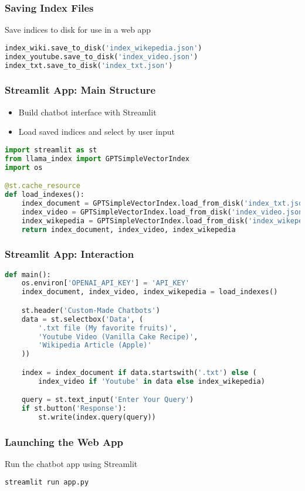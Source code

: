 \begin{frame}[fragile]\frametitle{Saving Index Files}

Save indices to disk for use in a web app

\begin{lstlisting}[language=Python]
index_wiki.save_to_disk('index_wikepedia.json')
index_youtube.save_to_disk('index_video.json')
index_txt.save_to_disk('index_txt.json')
\end{lstlisting}
\end{frame}

\begin{frame}[fragile]\frametitle{Streamlit App: Main Structure}
    \begin{itemize}
        \item Build chatbot interface with Streamlit
        \item Load saved indices and select by user input
    \end{itemize}
\begin{lstlisting}[language=Python]
import streamlit as st
from llama_index import GPTSimpleVectorIndex
import os

@st.cache_resource
def load_indexes():
    index_document = GPTSimpleVectorIndex.load_from_disk('index_txt.json')
    index_video = GPTSimpleVectorIndex.load_from_disk('index_video.json')
    index_wikepedia = GPTSimpleVectorIndex.load_from_disk('index_wikepedia.json')
    return index_document, index_video, index_wikepedia
\end{lstlisting}
\end{frame}

\begin{frame}[fragile]\frametitle{Streamlit App: Interaction}
\begin{lstlisting}[language=Python]
def main():
    os.environ['OPENAI_API_KEY'] = 'API_KEY'
    index_document, index_video, index_wikepedia = load_indexes()

    st.header('Custom-Made Chatbots')
    data = st.selectbox('Data', (
        '.txt file (My favorite fruits)', 
        'Youtube Video (Vanilla Cake Recipe)', 
        'Wikipedia Article (Apple)'
    ))

    index = index_document if data.startswith('.txt') else (
        index_video if 'Youtube' in data else index_wikepedia)

    query = st.text_input('Enter Your Query')
    if st.button('Response'):
        st.write(index.query(query))
\end{lstlisting}
\end{frame}

\begin{frame}[fragile]\frametitle{Launching the Web App}

Run the chatbot app using Streamlit

\begin{lstlisting}[language=bash]
streamlit run app.py
\end{lstlisting}

\end{frame}






